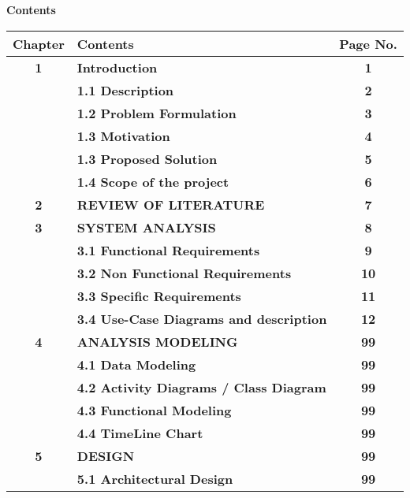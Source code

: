 \begingroup
\makeatletter

\pagestyle{plain}
\setlength{\parindent}{0pt}
\onehalfspacing
\fontsize{12pt}{14pt} \selectfont

\centerline{\Huge\bf Contents}
\vspace{4pt}

{\bf
\begin{table}[H]
    \centering
    \begin{tabular}{| >{\bfseries}c | >{\bfseries}p{13cm} | >{\bfseries}c |}

        \hline
        Chapter & Contents & Page No.

        \\ \hline
        1 & Introduction & 1
        \\ \hline
        & 1.1 Description & 2
        \\ \hline
        & 1.2 Problem Formulation & 3
        \\ \hline
        & 1.3 Motivation & 4
        \\ \hline
        & 1.3 Proposed Solution & 5
        \\ \hline
        & 1.4 Scope of the project & 6
        \\ \hline
        2 & REVIEW OF LITERATURE & 7
        \\ \hline
        3 & SYSTEM ANALYSIS & 8
        \\ \hline
        & 3.1 Functional Requirements & 9
        \\ \hline
        & 3.2 Non Functional Requirements & 10
        \\ \hline
        & 3.3 Specific Requirements & 11
        \\ \hline
        & 3.4 Use-Case Diagrams and description & 12
        \\ \hline
        4 & ANALYSIS MODELING & 99
        \\ \hline
        & 4.1 Data Modeling & 99
        \\ \hline
        & 4.2 Activity Diagrams / Class Diagram & 99
        \\ \hline
        & 4.3 Functional Modeling & 99
        \\ \hline
        & 4.4 TimeLine Chart & 99
        \\ \hline
        5 & DESIGN & 99
        \\ \hline
        & 5.1 Architectural Design & 99
        \\ \hline

\end{tabular}
\end{table}}
